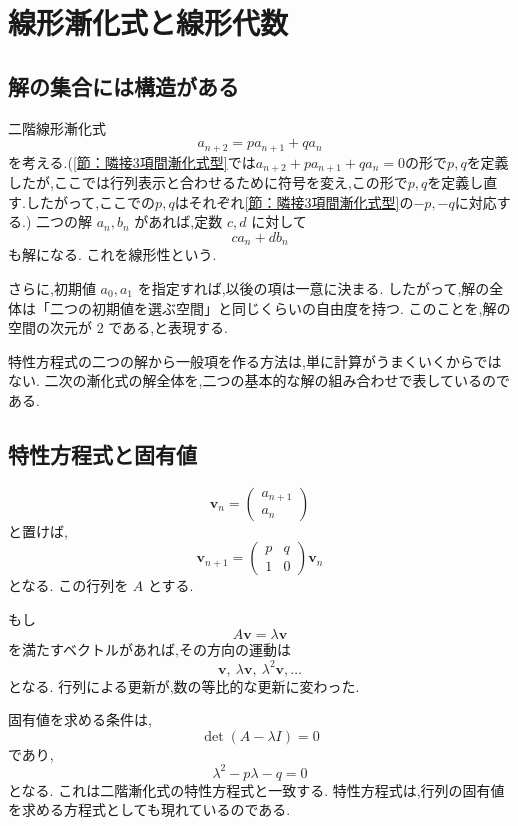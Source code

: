 
\section{線形漸化式と線形代数}

\subsection{解の集合には構造がある}

二階線形漸化式
\[
  a_{n+2}=pa_{n+1}+qa_n
\]
を考える.(\ref{節：隣接3項間漸化式型}では$a_{n+2}+pa_{n+1}+qa_n=0$の形で$p,q$を定義したが,ここでは行列表示と合わせるために符号を変え,この形で$p,q$を定義し直す.したがって,ここでの$p,q$はそれぞれ\ref{節：隣接3項間漸化式型}の$-p,-q$に対応する.)
二つの解 $a_n,b_n$ があれば,定数 $c,d$ に対して
\[
  c a_n+d b_n
\]
も解になる.
これを線形性という.

さらに,初期値 $a_0,a_1$ を指定すれば,以後の項は一意に決まる.
したがって,解の全体は「二つの初期値を選ぶ空間」と同じくらいの自由度を持つ.
このことを,解の空間の次元が $2$ である,と表現する.

特性方程式の二つの解から一般項を作る方法は,単に計算がうまくいくからではない.
二次の漸化式の解全体を,二つの基本的な解の組み合わせで表しているのである.

\subsection{特性方程式と固有値}

\[
  \boldsymbol v_n=
  \begin{pmatrix}a_{n+1}\\a_n\end{pmatrix}
\]
と置けば,
\[
  \boldsymbol v_{n+1}
  =
  \begin{pmatrix}p&q\\1&0\end{pmatrix}
  \boldsymbol v_n
\]
となる.
この行列を $A$ とする.

もし
\[
  A\boldsymbol v=\lambda\boldsymbol v
\]
を満たすベクトルがあれば,その方向の運動は
\[
  \boldsymbol v,\ \lambda\boldsymbol v,\ \lambda^2\boldsymbol v,\ldots
\]
となる.
行列による更新が,数の等比的な更新に変わった.

固有値を求める条件は,
\[
  \det(A-\lambda I)=0
\]
であり,
\[
  \lambda^2-p\lambda-q=0
\]
となる.
これは二階漸化式の特性方程式と一致する.
特性方程式は,行列の固有値を求める方程式としても現れているのである.

